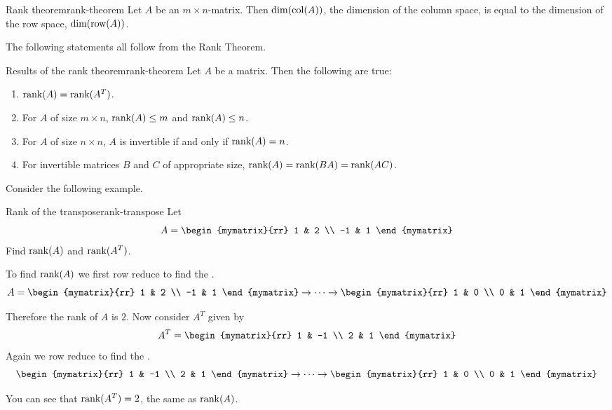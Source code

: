 \begin{theorem}{Rank theorem}{rank-theorem}
Let $A$ be an $m \times n$-matrix. Then $\mbox{\rm dim}(\mbox{\rm col} (A))$, the dimension of the column space, is equal to the dimension of the row space, $\mbox{\rm dim}(\mbox{\rm row}(A))$.
\end{theorem}

The following statements all follow from the Rank Theorem.

\begin{corollary}{Results of the rank theorem}{rank-theorem}
Let $A$ be a matrix. Then the following are true:
\begin{enumerate}
\item
 $\mbox{\rm rank}(A) = \mbox{\rm rank}(A^T)$.
\item
For $A$ of size $m \times n$, $\mbox{\rm rank}(A) \leq m$ and $\mbox{\rm rank}(A) \leq n$.
\item
For $A$ of size $n \times n$,  $A$ is invertible if and only if $\mbox{\rm rank}(A) = n$.
\item
For invertible matrices $B$ and $C$ of appropriate size, 
$\mbox{\rm rank}(A) = \mbox{\rm rank}(BA) = \mbox{\rm rank}(AC)$. 
\end{enumerate}
\end{corollary}

Consider the following example.

\begin{example}{Rank of the transpose}{rank-transpose}
Let \[
A = 
\begin{mymatrix}{rr}
1 & 2 \\
-1 & 1 
\end{mymatrix}
\]
Find $\mbox{\rm rank}(A)$ and $\mbox{\rm rank}(A^T)$.
\end{example}

\begin{solution}
To find $\mbox{\rm rank}(A)$ we first row reduce to find the {\rref}.
\[
A = 
\begin{mymatrix}{rr}
1 & 2 \\
-1 & 1 
\end{mymatrix}
\rightarrow \cdots \rightarrow
\begin{mymatrix}{rr}
1 & 0 \\
0 & 1 
\end{mymatrix}
\]

Therefore the rank of $A$ is $2$. Now consider $A^T$ given by 
\[
A^T = \begin{mymatrix}{rr}
1 & -1 \\
2 & 1 
\end{mymatrix}
\]
Again we row reduce to find the {\rref}.
\[
\begin{mymatrix}{rr}
1 & -1 \\
2 & 1 
\end{mymatrix}
\rightarrow \cdots \rightarrow
\begin{mymatrix}{rr}
1 & 0 \\
0 & 1 
\end{mymatrix}
\]

You can see that $\mbox{\rm rank}(A^T) = 2$, the same as $\mbox{\rm rank}(A)$. 
\end{solution}

